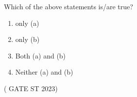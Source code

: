 \begin{enumerate}[label=\thechapter.\arabic*,ref=\thechapter.\theenumi]
\begin{enumerate}[label=(\alph*)]
Which of the above statements is/are true?\\
\end{enumerate}
\begin{enumerate}[label=(\roman*)]
\item only (a)
\item only (b)
\item Both (a) and (b)
\item Neither (a) and (b)
\end{enumerate}
\hfill ( GATE ST 2023)\\
\solution \\

\end{enumerate}
